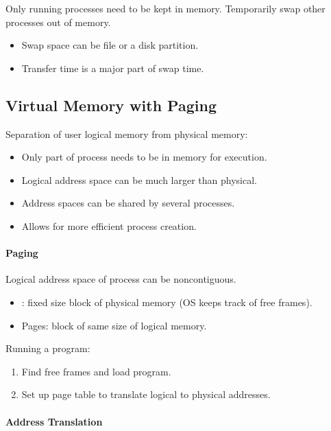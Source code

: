 \documentclass[twocolumn,english]{article}
\let\emph\relax
\begin{document}
Only running processes need to be kept in memory. Temporarily swap
other processes out of memory. 
\begin{itemize}
\item Swap space can be file or a disk partition. 
\item Transfer time is a major part of swap time. 
\end{itemize}

\subsection{Virtual Memory with Paging}

Separation of user logical memory from physical memory: 
\begin{itemize}
\item Only part of process needs to be in memory for execution. 
\item Logical address space can be much larger than physical. 
\item Address spaces can be shared by several processes. 
\item Allows for more efficient process creation. 
\end{itemize}

\paragraph{Paging}

Logical address space of process can be noncontiguous. 
\begin{itemize}
\item \emph{Frames}: fixed size block of physical memory (OS keeps track
of free frames). 
\item Pages: block of same size of logical memory. 
\end{itemize}
Running a program: 
\begin{enumerate}
\item Find free frames and load program. 
\item Set up page table to translate logical to physical addresses. 
\end{enumerate}

\paragraph{Address Translation}
\end{document}
